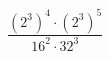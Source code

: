 \begin{ex}[type=calculate]
	\begin{condition}
		\( \dfrac{(2^3)^4\cdot(2^3)^5}{16^2\cdot32^3} \)
	\end{condition}
\end{ex}